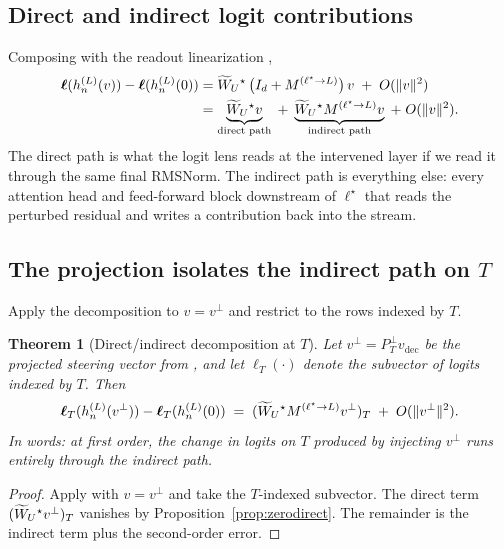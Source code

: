 \documentclass[11pt,letterpaper]{article}
\theoremstyle{plain}
\newtheorem{theorem}{Theorem}[section]
\theoremstyle{definition}
\newcommand{\1}{\mathbf{1}}
\newcommand{\WUt}{\widetilde{W}_{U}\mathchoice{}{}{}{}}
\newcommand{\vdec}{v_{\text{dec}}}
\newcommand{\vperp}{v^{\perp}}
\newcommand{\PTperp}{P_{T}^{\perp}}
\newcommand{\hres}{h}
\begin{document}
\subsection{Direct and indirect logit contributions}

Composing  with the readout linearization ,
\begin{align}
\bm{\ell}(\hres^{(L)}_n(v)) - \bm{\ell}(\hres^{(L)}_n(0))
&= \WUt^\star\,\big(I_d + M^{(\ell^\star \to L)}\big)\, v \;+\; O(\|v\|^2) \nonumber\\
&= \underbrace{\WUt^\star v}_{\text{direct path}} \;+\; \underbrace{\WUt^\star M^{(\ell^\star \to L)} v}_{\text{indirect path}} \;+\; O(\|v\|^2).
\label{eq:directindirect}
\end{align}
The direct path is what the logit lens \cite{nostalgebraist2020logitlens} reads at the intervened layer if we read it through the same final RMSNorm. The indirect path is everything else: every attention head and feed-forward block downstream of $\ell^\star$ that reads the perturbed residual and writes a contribution back into the stream.

\subsection{The projection isolates the indirect path on $T$}

Apply the decomposition to $v = \vperp$ and restrict to the rows indexed by $T$.

\begin{theorem}[Direct/indirect decomposition at $T$]\label{thm:decomp}
Let $\vperp = \PTperp \vdec$ be the projected steering vector from , and let $\bm{\ell}_T(\cdot)$ denote the subvector of logits indexed by $T$. Then
\begin{equation}
\bm{\ell}_T(\hres^{(L)}_n(\vperp)) - \bm{\ell}_T(\hres^{(L)}_n(0)) \;=\; (\WUt^\star M^{(\ell^\star \to L)} \vperp)_T \;+\; O(\|\vperp\|^2).
\label{eq:thm}
\end{equation}
In words: at first order, the change in logits on $T$ produced by injecting $\vperp$ runs entirely through the indirect path.
\end{theorem}

\begin{proof}
Apply  with $v = \vperp$ and take the $T$-indexed subvector. The direct term $(\WUt^\star \vperp)_T$ vanishes by Proposition~\ref{prop:zerodirect}. The remainder is the indirect term plus the second-order error.
\end{proof}
\end{document}
